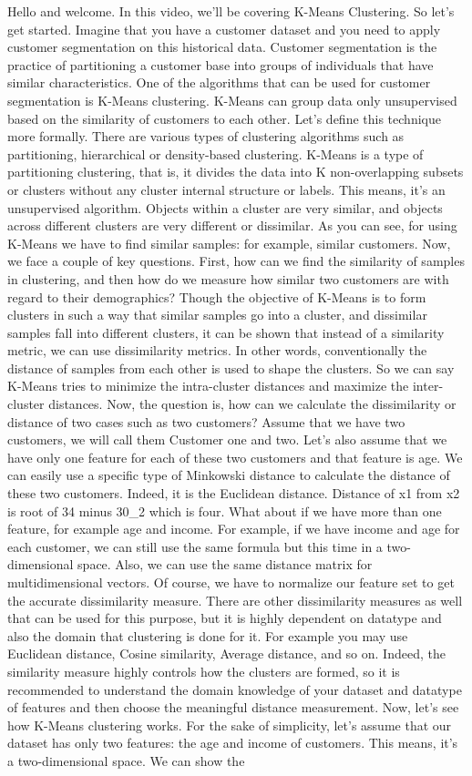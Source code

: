 Hello and welcome. In this video, we'll be covering K-Means Clustering. So let's get started. Imagine that you have a customer dataset and you need to apply customer segmentation on this historical data. Customer segmentation is the practice of partitioning a customer base into groups of individuals that have similar characteristics. One of the algorithms that can be used for customer segmentation is K-Means clustering. K-Means can group data only unsupervised based on the similarity of customers to each other. Let's define this technique more formally. There are various types of clustering algorithms such as partitioning, hierarchical or density-based clustering. K-Means is a type of partitioning clustering, that is, it divides the data into K non-overlapping subsets or clusters without any cluster internal structure or labels. This means, it's an unsupervised algorithm. Objects within a cluster are very similar, and objects across different clusters are very different or dissimilar. As you can see, for using K-Means we have to find similar samples: for example, similar customers. Now, we face a couple of key questions. First, how can we find the similarity of samples in clustering, and then how do we measure how similar two customers are with regard to their demographics? Though the objective of K-Means is to form clusters in such a way that similar samples go into a cluster, and dissimilar samples fall into different clusters, it can be shown that instead of a similarity metric, we can use dissimilarity metrics. In other words, conventionally the distance of samples from each other is used to shape the clusters. So we can say K-Means tries to minimize the intra-cluster distances and maximize the inter-cluster distances. Now, the question is, how can we calculate the dissimilarity or distance of two cases such as two customers? Assume that we have two customers, we will call them Customer one and two. Let's also assume that we have only one feature for each of these two customers and that feature is age. We can easily use a specific type of Minkowski distance to calculate the distance of these two customers. Indeed, it is the Euclidean distance. Distance of x1 from x2 is root of 34 minus 30_2 which is four. What about if we have more than one feature, for example age and income. For example, if we have income and age for each customer, we can still use the same formula but this time in a two-dimensional space. Also, we can use the same distance matrix for multidimensional vectors. Of course, we have to normalize our feature set to get the accurate dissimilarity measure. There are other dissimilarity measures as well that can be used for this purpose, but it is highly dependent on datatype and also the domain that clustering is done for it. For example you may use Euclidean distance, Cosine similarity, Average distance, and so on. Indeed, the similarity measure highly controls how the clusters are formed, so it is recommended to understand the domain knowledge of your dataset and datatype of features and then choose the meaningful distance measurement. Now, let's see how K-Means clustering works. For the sake of simplicity, let's assume that our dataset has only two features: the age and income of customers. This means, it's a two-dimensional space. We can show the 
